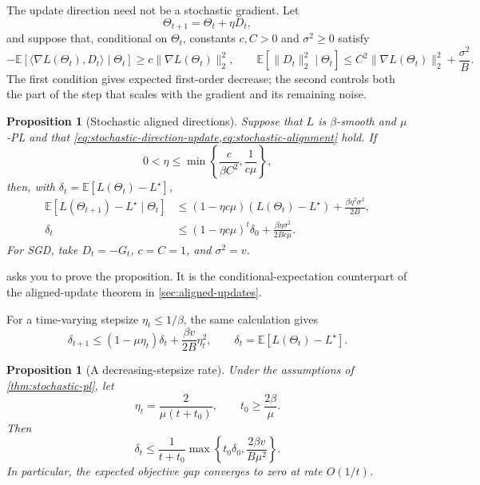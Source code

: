 \documentclass[11pt,twoside]{article}
\newcommand{\E}{\mathbb E}
\newtheorem{proposition}[theorem]{Proposition}
\theoremstyle{definition}
\theoremstyle{remark}
\begin{document}
The update direction need not be a stochastic gradient. Let
\begin{equation}
 \Theta_{t+1}=\Theta_t+\eta D_t,
 \label{eq:stochastic-direction-update}
\end{equation}
and suppose that, conditional on $\Theta_t$, constants $c,C>0$ and
$\sigma^2\ge0$ satisfy
\begin{equation}
 -\E[\langle\nabla L(\Theta_t),D_t\rangle\mid\Theta_t]
 \ge c\|\nabla L(\Theta_t)\|_2^2,
 \qquad
 \E[\|D_t\|_2^2\mid\Theta_t]
 \le C^2\|\nabla L(\Theta_t)\|_2^2+\frac{\sigma^2}{B}.
 \label{eq:stochastic-alignment}
\end{equation}
The first condition gives expected first-order decrease; the second controls
both the part of the step that scales with the gradient and its remaining
noise.

\begin{proposition}[Stochastic aligned directions]
\label{prop:stochastic-aligned}
Suppose that $L$ is $\beta$-smooth and $\mu$-PL and that
\cref{eq:stochastic-direction-update,eq:stochastic-alignment} hold. If
\[
 0<\eta\le
 \min\left\{\frac{c}{\beta C^2},\frac1{c\mu}\right\},
\]
then, with $\delta_t=\E[L(\Theta_t)-L^\star]$,
\begin{align}
 \E[L(\Theta_{t+1})-L^\star\mid\Theta_t]
 &\le(1-\eta c\mu)(L(\Theta_t)-L^\star)
    +\frac{\beta\eta^2\sigma^2}{2B},
 \label{eq:stochastic-aligned-one-step}\\
 \delta_t
 &\le(1-\eta c\mu)^t\delta_0
    +\frac{\beta\eta\sigma^2}{2Bc\mu}.
 \label{eq:stochastic-aligned-unrolled}
\end{align}
For SGD, take $D_t=-G_t$, $c=C=1$, and $\sigma^2=v$.
\end{proposition}

 asks you to prove the proposition. It is the
conditional-expectation counterpart of the aligned-update theorem in
\cref{sec:aligned-updates}.

For a time-varying stepsize $\eta_t\le1/\beta$, the same calculation gives
\[
 \delta_{t+1}
 \le(1-\mu\eta_t)\delta_t
 +\frac{\beta v}{2B}\eta_t^2,
 \qquad
 \delta_t=\E[L(\Theta_t)-L^\star].
\]

\begin{proposition}[A decreasing-stepsize rate]
\label{prop:decreasing-sgd}
Under the assumptions of \cref{thm:stochastic-pl}, let
\[
 \eta_t=\frac{2}{\mu(t+t_0)},
 \qquad
 t_0\ge\frac{2\beta}{\mu}.
\]
Then
\begin{equation}
 \delta_t
 \le\frac{1}{t+t_0}
 \max\left\{
 t_0\delta_0,\frac{2\beta v}{B\mu^2}
 \right\}.
 \label{eq:decreasing-sgd-rate}
\end{equation}
In particular, the expected objective gap converges to zero at rate $O(1/t)$.
\end{proposition}
\end{document}
